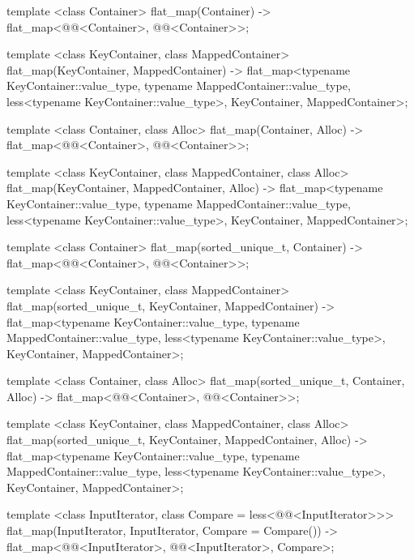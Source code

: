 \begin{codeblock}
\begin{codeblock}
\begin{codeblock}
\begin{addedblock}
\begin{codeblock}
{  template <class Container>
    flat_map(Container)
      -> flat_map<@@<Container>, @@<Container>>;

  template <class KeyContainer, class MappedContainer>
    flat_map(KeyContainer, MappedContainer)
      -> flat_map<typename KeyContainer::value_type,
                  typename MappedContainer::value_type,
                  less<typename KeyContainer::value_type>,
                  KeyContainer, MappedContainer>;

  template <class Container, class Alloc>
    flat_map(Container, Alloc)
      -> flat_map<@@<Container>, @@<Container>>;

  template <class KeyContainer, class MappedContainer, class Alloc>
    flat_map(KeyContainer, MappedContainer, Alloc)
      -> flat_map<typename KeyContainer::value_type,
                  typename MappedContainer::value_type,
                  less<typename KeyContainer::value_type>,
                  KeyContainer, MappedContainer>;

  template <class Container>
    flat_map(sorted_unique_t, Container)
      -> flat_map<@@<Container>, @@<Container>>;

  template <class KeyContainer, class MappedContainer>
    flat_map(sorted_unique_t, KeyContainer, MappedContainer)
      -> flat_map<typename KeyContainer::value_type,
                  typename MappedContainer::value_type,
                  less<typename KeyContainer::value_type>,
                  KeyContainer, MappedContainer>;

  template <class Container, class Alloc>
    flat_map(sorted_unique_t, Container, Alloc)
      -> flat_map<@@<Container>, @@<Container>>;

  template <class KeyContainer, class MappedContainer, class Alloc>
    flat_map(sorted_unique_t, KeyContainer, MappedContainer, Alloc)
      -> flat_map<typename KeyContainer::value_type,
                  typename MappedContainer::value_type,
                  less<typename KeyContainer::value_type>,
                  KeyContainer, MappedContainer>;

  template <class InputIterator, class Compare = less<@@<InputIterator>>>
    flat_map(InputIterator, InputIterator, Compare = Compare())
      -> flat_map<@@<InputIterator>, @@<InputIterator>, Compare>;

}
\end{codeblock}
\end{addedblock}
\end{codeblock}
\end{codeblock}
\end{codeblock}

